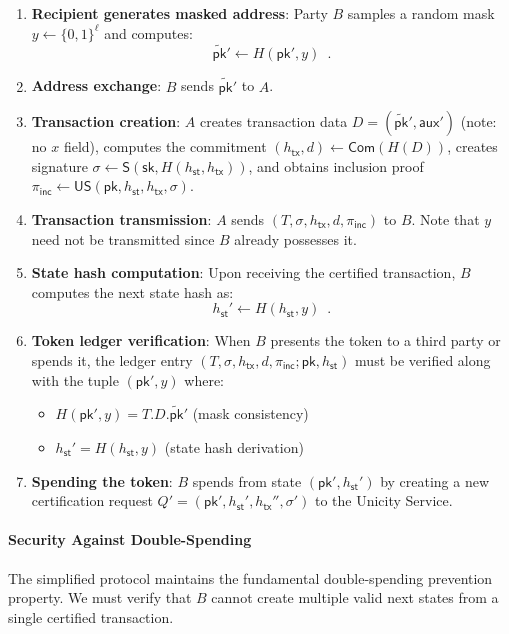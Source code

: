 \documentclass{article}
\newcommand{\sig}[0]{\mathsf{S}}
\newcommand{\pubkey}[0]{\mathsf{pk}}
\newcommand{\prikey}[0]{\mathsf{sk}}
\newcommand{\mpubkey}{\widetilde{\pubkey}}
\newcommand{\commit}[0]{\mathsf{Com}}
\newcommand{\unisrv}[0]{\mathsf{US}}
\newcommand{\sthash}[0]{{h_\mathsf{st}}}
\newcommand{\txhash}[0]{{h_\mathsf{tx}}}
\newcommand{\auxd}[0]{\mathsf{aux}}
\newcommand{\pinc}[0]{{\pi_{\mathsf{inc}}}}
\begin{document}
\begin{enumerate}
\item \textbf{Recipient generates masked address}: Party $B$ samples a random mask $y \gets \{0,1\}^\ell$ and computes:
\[
\mpubkey' \gets H(\pubkey', y) \enspace.
\]

\item \textbf{Address exchange}: $B$ sends $\mpubkey'$ to $A$.

\item \textbf{Transaction creation}: $A$ creates transaction data $D = (\mpubkey', \auxd')$ (note: no $x$ field), computes the commitment $(\txhash, d) \gets \commit(H(D))$, creates signature $\sigma \gets \sig(\prikey, H(\sthash, \txhash))$, and obtains inclusion proof $\pinc \gets \unisrv(\pubkey, \sthash, \txhash, \sigma)$.

\item \textbf{Transaction transmission}: $A$ sends $(T, \sigma, \txhash, d, \pinc)$ to $B$. Note that $y$ need not be transmitted since $B$ already possesses it.

\item \textbf{State hash computation}: Upon receiving the certified transaction, $B$ computes the next state hash as:
\[
\sthash' \gets H(\sthash, y) \enspace.
\]

\item \textbf{Token ledger verification}: When $B$ presents the token to a third party or spends it, the ledger entry $(T, \sigma, \txhash, d, \pinc; \pubkey, \sthash)$ must be verified along with the tuple $(\pubkey', y)$ where:
\begin{itemize}
\item $H(\pubkey', y) = T.D.\mpubkey'$ (mask consistency)
\item $\sthash' = H(\sthash, y)$ (state hash derivation)
\end{itemize}

\item \textbf{Spending the token}: $B$ spends from state $(\pubkey', \sthash')$ by creating a new certification request $Q' = (\pubkey', \sthash', \txhash'', \sigma')$ to the Unicity Service.
\end{enumerate}

\paragraph{Security Against Double-Spending}

The simplified protocol maintains the fundamental double-spending prevention property. We must verify that $B$ cannot create multiple valid next states from a single certified transaction.
\end{document}
